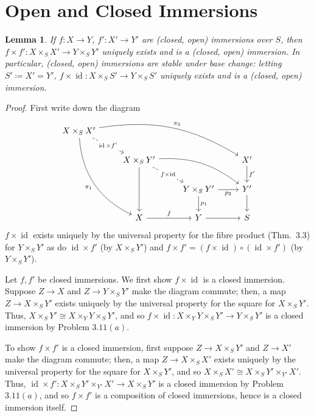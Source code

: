 \documentclass[12pt,letterpaper]{article}
\newtheorem{lemma}{Lemma}[section]
\theoremstyle{definition}
\theoremstyle{remark}
\numberwithin{equation}{section}
\numberwithin{figure}{problem}
\DeclareMathOperator{\id}{id}
\begin{document}
\section{Open and Closed Immersions}
\begin{lemma}\label{immbasechange}
  If $f\colon X \to Y$, $f'\colon X' \to Y'$ are (closed, open) immersions over $S$, then $f \times f'\colon X \times_S X' \to Y \times_S Y'$ uniquely exists and is a (closed, open) immersion. In particular, (closed, open) immersions are stable under base change: letting $S' \coloneqq X' = Y'$, $f \times \id \colon X \times_S S'\to Y \times_S S'$ uniquely exists and is a (closed, open) immersion.
\end{lemma}
\begin{proof}
  First write down the diagram
  \begin{equation*}
    \begin{tikzcd}
      X \times_S X'\arrow[dashed]{dr}[description]{\id \times f'}\arrow[bend right]{dddr}[swap]{\pi_1}\arrow[bend left=20]{drrr}{\pi_2}\\
      & X \times_S Y'\arrow{dd}\arrow[dashed]{dr}[description]{f \times \id}\arrow[bend left=20,crossing over]{drr} & & X'\dar{f'}\\
      & & Y \times_S Y' \rar[swap]{p_2}\dar{p_1} & Y'\dar\\
      & X \rar{f} & Y \rar & S
    \end{tikzcd}
  \end{equation*}
  $f \times \id$ exists uniquely by the universal property for the fibre product (Thm.~3.3) for $Y \times_S Y'$ as do $\id \times f'$ (by $X \times_S Y'$) and $f \times f' = (f \times \id) \circ (\id \times f')$ (by $Y \times_S Y'$).
  \par Let $f,f'$ be closed immersions. We first show $f \times \id$ is a closed immersion. Suppose $Z \to X$ and $Z \to Y \times_S Y'$ make the diagram commute; then, a map $Z \to X \times_S Y'$ exists uniquely by the universal property for the square for $X \times_S Y'$. Thus, $X \times_S Y' \cong X \times_Y Y \times_S Y'$, and so $f \times \id\colon X \times_Y Y \times_S Y' \to Y \times_S Y'$ is a closed immersion by Problem $3.11(a)$.
  \par To show $f \times f'$ is a closed immersion, first suppose $Z \to X \times_S Y'$ and $Z \to X'$ make the diagram commute; then, a map $Z \to X \times_S X'$ exists uniquely by the universal property for the square for $X \times_S Y'$, and so $X \times_S X' \cong X \times_S Y' \times_{Y'} X'$. Thus, $\id \times f' \colon X \times_S Y' \times_{Y'} X' \to X \times_S Y'$ is a closed immersion by Problem $3.11(a)$, and so $f \times f'$ is a composition of closed immersions, hence is a closed immersion itself.

\end{proof}
\end{document}
